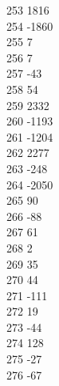 { 253	1816 \\
 254	-1860 \\
 255	7 \\
 256	7 \\
 257	-43 \\
 258	54 \\
 259	2332 \\
 260	-1193 \\
 261	-1204 \\
 262	2277 \\
 263	-248 \\
 264	-2050 \\
 265	90 \\
 266	-88 \\
 267	61 \\
 268	2 \\
 269	35 \\
 270	44 \\
 271	-111 \\
 272	19 \\
 273	-44 \\
 274	128 \\
 275	-27 \\
 276	-67 \\
}
